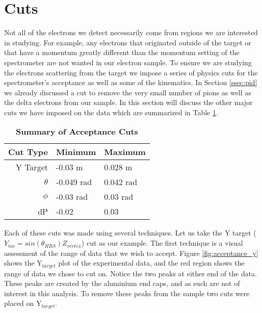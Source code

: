 
\section{Cuts}
\label{sec:cuts}

Not all of the electrons we detect necessarily come from regions we are interested in studying. For example, any electrons that originated outside of the target or that have a momentum greatly different than the momentum setting of the spectrometer are not wanted in our electron sample. To ensure we are studying the electrons scattering from the target we impose a series of physics cuts for the spectrometer's acceptance as well as some of the kinematics. In Section \ref{ssec:pid} we already discussed a cut to remove the very small number of pions as well as the delta electrons from our sample. In this section will discuss the other major cuts we have imposed on the data which are summarized in Table \ref{tab:cuts}. 

\vspace{5mm}

\begin{table}[!h]
\centering
\begin{tabular}{|r | l l|}
\hline
\textbf{Cut Type} & \textbf{Minimum} & \textbf{Maximum}\\
\hline
Y Target & -0.03 m & 0.028 m\\ 
$\theta$ & -0.049 rad & 0.042 rad\\ 
$\phi$ & -0.03 rad & 0.03 rad\\ 
dP & -0.02 & 0.03\\ 
\hline
\end{tabular}
\caption[Summary of Acceptance Cuts]{{\bf{Summary of Acceptance Cuts}} }
\label{tab:cuts}
\end{table}

Each of these cuts was made using several techniques. Let us take the Y target ($Y_{tar}=sin\left(\theta_{HRS}\right)Z_{vertex}$) cut as our example. The first technique is a visual assessment of the range of data that we wish to accept. Figure \ref{fig:acceptance_y} shows the Y$_{target}$ plot of the experimental data, and the red region shows the range of data we chose to cut on. Notice the two peaks at either end of the data. These peaks are created by the aluminium end caps, and as such are not of interest in this analysis. To remove these peaks from the sample two cuts were placed on Y$_{target}$. 

